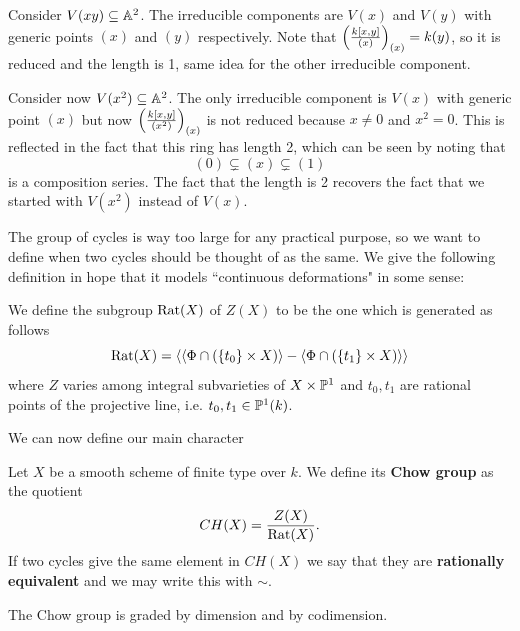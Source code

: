 \begin{example}
Consider $V(xy)\subseteq \mathbb{A}^2$. The irreducible components are $V(x)$ and $V(y)$ with generic points $(x)$ and $(y)$ respectively. Note that $\left({\frac{k[x,y]}{(x)}}\right)_{(x)}=k(y)$, so it is reduced and the length is 1, same idea for the other irreducible component.
\medskip

Consider now $V(x^2)\subseteq \mathbb{A}^2$. The only irreducible component is $V(x)$ with generic point $(x)$ but now $\left({\frac{k[x,y]}{(x^2)}}\right)_{(x)}$ is not reduced because $x\neq 0$ and $x^2=0$. This is reflected in the fact that this ring has length 2, which can be seen by noting that
\[(0)\subsetneq (x)\subsetneq (1)\]
is a composition series. The fact that the length is 2 recovers the fact that we started with $V(x^2)$ instead of $V(x)$.
\end{example}

The group of cycles is way too large for any practical purpose, so we want to define when two cycles should be thought of as the same. We give the following definition in hope that it models ``continuous deformations" in some sense:

\begin{definition}[]
We define the subgroup $\mathrm{Rat}(X)$ of $Z(X)$ to be the one which is generated as follows
\[\mathrm{Rat}(X)=\left\langle {\left\langle {\Phi\cap (\left\{{t_0}\right\}\times X)}\right\rangle-\left\langle {\Phi\cap (\left\{{t_1}\right\}\times X)}\right\rangle}\right\rangle\]
where $Z$ varies among integral subvarieties of $X\times \mathbb{P}^1$ and $t_0,t_1$ are rational points of the projective line, i.e. $t_0,t_1\in \mathbb{P}^1(k)$.
\end{definition}

We can now define our main character

\begin{definition}[]
Let $X$ be a smooth scheme of finite type over $k$. We define its \textbf{Chow group} as the quotient
\[CH(X)=\frac{Z(X)}{\mathrm{Rat}(X)}.\]
If two cycles give the same element in $CH(X)$ we say that they are \textbf{rationally equivalent} and we may write this with $\sim$.
\end{definition}

\begin{remark}
The Chow group is graded by dimension and by codimension.
\end{remark}

